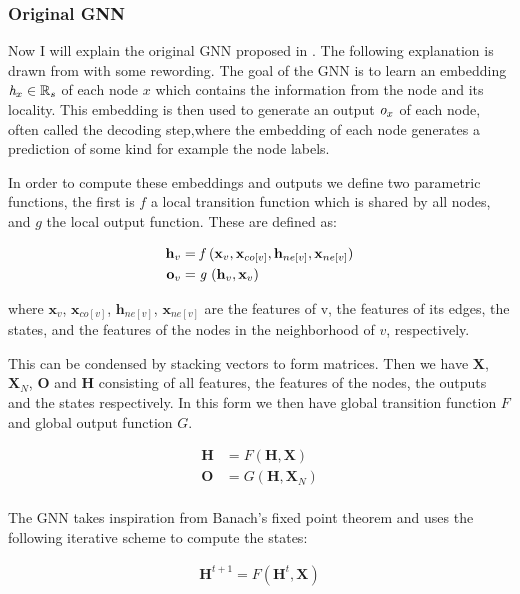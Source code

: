 \documentclass[]{../resources/final_report}
\newcommand{\Reals}{\mathbb{R}}
\begin{document}
\pagebreak
\subsubsection{Original GNN}

Now I will explain the original GNN proposed in \cite{GNN}. The following explanation is drawn from \cite{graphoverview} with some rewording. The goal of the GNN is to learn an embedding $ \emph{h}_x \in \Reals_s $ of each node $x$ which contains the information from the node and its locality. This embedding is then used to generate an output $\emph{o}_x$ of each node, often called the decoding step,where the embedding of each node generates a prediction of some kind for example the node labels.

In order to compute these embeddings and outputs we define two parametric functions, the first is $f$ a local transition function which is shared by all nodes, and $g$ the local output function. These are defined as:

\begin{align}
  \textbf{h}_v &= \emph{f }(\textbf{x}_v, \textbf{x}_{co[v]}, \textbf{h}_{ne[v]}, \textbf{x}_{ne[v]})\\
  \textbf{o}_v &= \emph{g }(\textbf{h}_v, \textbf{x}_v)
\end{align}

where $\textbf{x}_v$, $\textbf{x}_{co[v]}$, $\textbf{h}_{ne[v]}$, $\textbf{x}_{ne[v]}$ are the features of v, the features of its edges, the states, and the features of the nodes in the neighborhood of $v$, respectively.

This can be condensed by stacking vectors to form matrices. Then we have $\textbf{X}$, $\textbf{X}_N$, $\textbf{O}$ and $\textbf{H}$ consisting of all features, the features of the nodes, the outputs and the states respectively. In this form we then have global transition function $F$ and global output function $G$.

\begin{align}
  \textbf{H} &= F(\textbf{H}, \textbf{X})\\
  \textbf{O} &= G(\textbf{H}, \textbf{X}_N)\\
\end{align}

The GNN takes inspiration from Banach's fixed point theorem \cite{khamsi_kirk_2011} and uses the following iterative scheme to compute the states:

\begin{align}
  \textbf{H}^{t+1} = F(\textbf{H}^t, \textbf{X})
\end{align}
\end{document}
